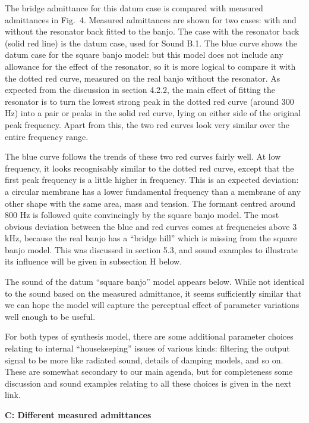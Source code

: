   The bridge admittance for this datum case is compared with measured 
  admittances in Fig.\ 4. Measured admittances are shown for two cases: with 
  and without the resonator back fitted to the banjo. The case with the 
  resonator back (solid red line) is the datum case, used for Sound B.1. The 
  blue curve shows the datum case for the square banjo model: but this model 
  does not include any allowance for the effect of the resonator, so it is more 
  logical to compare it with the dotted red curve, measured on the real banjo 
  without the resonator. As expected from the discussion in section 4.2.2, the 
  main effect of fitting the resonator is to turn the lowest strong peak in the 
  dotted red curve (around 300 Hz) into a pair or peaks in the solid red curve, 
  lying on either side of the original peak frequency. Apart from this, the two 
  red curves look very similar over the entire frequency range. 

  The blue curve follows the trends of these two red curves fairly well. At low 
  frequency, it looks recognisably similar to the dotted red curve, except that 
  the first peak frequency is a little higher in frequency. This is an expected 
  deviation: a circular membrane has a lower fundamental frequency than a 
  membrane of any other shape with the same area, mass and tension. The formant 
  centred around 800 Hz is followed quite convincingly by the square banjo 
  model. The most obvious deviation between the blue and red curves comes at 
  frequencies above 3 kHz, because the real banjo has a ``bridge hill'' which 
  is missing from the square banjo model. This was discussed in section 5.3, 
  and sound examples to illustrate its influence will be given in subsection H 
  below. 

  The sound of the datum ``square banjo'' model appears below. While not 
  identical to the sound based on the measured admittance, it seems 
  sufficiently similar that we can hope the model will capture the perceptual 
  effect of parameter variations well enough to be useful. 

  For both types of synthesis model, there are some additional parameter 
  choices relating to internal ``housekeeping'' issues of various kinds: 
  filtering the output signal to be more like radiated sound, details of 
  damping models, and so on. These are somewhat secondary to our main agenda, 
  but for completeness some discussion and sound examples relating to all these 
  choices is given in the next link. 

  \textbf{C: Different measured admittances} 

